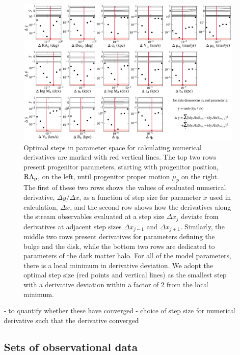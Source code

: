 \documentclass[modern]{aastex61}
\begin{document}
\begin{figure}
\begin{center}
\includegraphics[width=\textwidth]{derivative_steps.pdf}
\caption{Optimal steps in parameter space for calculating numerical derivatives are marked with red vertical lines.
The top two rows present progenitor parameters, starting with progenitor position, $\rm RA_p$, on the left, until progenitor proper motion $\mu_p$ on the right.
The first of these two rows shows the values of evaluated numerical derivative, $\Delta y/\Delta x$, as a function of step size for parameter $x$ used in calculation, $\Delta x$, and the second row shows how the derivatives along the stream observables evaluated at a step size $\Delta x_j$ deviate from derivatives at adjacent step sizes $\Delta x_{j-1}$ and $\Delta x_{j+1}$.
Similarly, the middle two rows present derivatives for parameters defining the bulge and the disk, while the bottom two rows are dedicated to parameters of the dark matter halo.
For all of the model parameters, there is a local minimum in derivative deviation.
We adopt the optimal step size (red points and vertical lines) as the smallest step with a derivative deviation within a factor of 2 from the local minimum.
}
\label{fig:derivative_conv}
\end{center}
\end{figure}

- to quantify whether these have converged
- choice of step size for numerical derivative such that the derivative converged

\subsection{Sets of observational data}
\label{sec:datasets}
\end{document}
